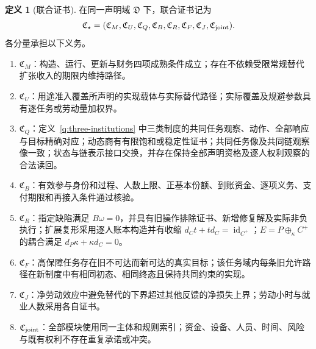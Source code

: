 \documentclass[UTF8,12pt,a4paper,openany,fontset=none,zihao=false]{ctexrep}
\theoremstyle{definition}
\newtheorem{definition}{定义}[chapter]
\DeclareMathOperator{\id}{id}
\newcommand{\1}{\mathbf 1}
\begin{document}
\begin{definition}[联合证书]
\label{joint:certificate}
在同一声明域 \(\mathfrak D\) 下，联合证书记为
\[
\mathfrak C_\star=(\mathfrak C_M,\mathfrak C_U,\mathfrak C_Q,
\mathfrak C_B,\mathfrak C_R,\mathfrak C_F,\mathfrak C_J,\mathfrak C_{\rm joint}).
\]
各分量承担以下义务。
\begin{enumerate}[label=\textnormal{\arabic*.}]
  \item \(\mathfrak C_M\)：构造、运行、更新与财务四项成熟条件成立；存在不依赖受限常规替代扩张收入的期限内维持路径。
  \item \(\mathfrak C_U\)：用途准入覆盖所声明的实现载体与实际替代路径；实际覆盖及规避参数具有逐任务或劳动量加权界。
  \item \(\mathfrak C_Q\)：定义~\ref{q:three-institutions} 中三类制度的共同任务观察、动作、全部响应与目标精确对应；动态商有有限饱和或稳定性证书；共同任务像及共同链观察像一致；状态与链表示接口交换，并存在保持全部声明资格及逐人权利观察的合法读回。
  \item \(\mathfrak C_B\)：有效参与身份和过程、人数上限、正基本份额、到账资金、逐项义务、支付期限和再接入条件通过核验。
  \item \(\mathfrak C_R\)：指定缺陷满足 \(B\omega=0\)，并具有旧操作排除证书、新增修复解及实际非负执行；扩展复形采用逐人账本构造并有收缩 \(d_Ct+td_C=\id_{C^+}\)；\(E=P\oplus_\kappa C^+\) 的耦合满足 \(d_P\kappa+\kappa d_C=0\)。
  \item \(\mathfrak C_F\)：高保障任务存在旧不可达而新可达的真实目标；该任务域内每条旧允许路径在新制度中有相同初态、相同终态且保持共同约束的实现。
  \item \(\mathfrak C_J\)：净劳动效应中避免替代的下界超过其他反馈的净损失上界；劳动小时与就业人数采用各自证书。
  \item \(\mathfrak C_{\rm joint}\)：全部模块使用同一主体和规则索引；资金、设备、人员、时间、风险与既有权利不存在重复承诺或冲突。
\end{enumerate}
\end{definition}
\end{document}
